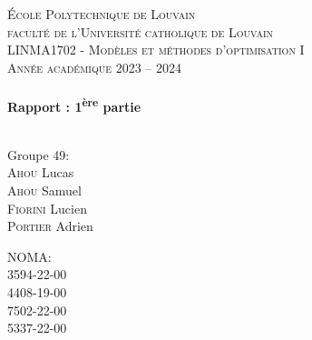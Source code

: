 
\thispagestyle{empty}
\begin{titlepage}
	\begin{center}
		\begin{figure}
			\hfill
        \end{figure}
		
		\textsc{\LARGE École Polytechnique de Louvain\\faculté de l'Université catholique de Louvain}\\[1cm]

		\textsc{\large LINMA1702 - Modèles et méthodes d'optimisation I}\\[0.5cm]
		\textsc{\large Année académique 2023 -- 2024}\\[0.5cm]

		\HRule \\[0.4cm]
		{ \huge \bfseries Rapport : 1\textsuperscript{ère} partie\\[0.4cm] }
		\HRule \\[0.75cm]

		
\begin{minipage}{0.4\textwidth}
\begin{flushleft}
\Large
Groupe 49:\\
\textsc{Ahou} Lucas\\
\textsc{Ahou}  Samuel \\
\textsc{Fiorini} Lucien \\
\textsc{Portier}  Adrien \\

\end{flushleft}
\end{minipage}
\begin{minipage}{0.4\textwidth}
\begin{flushright}
\Large
NOMA:\\
3594-22-00\\
4408-19-00\\
7502-22-00 \\
5337-22-00\\
\end{flushright}
\end{minipage}



\end{center}
\end{titlepage}
